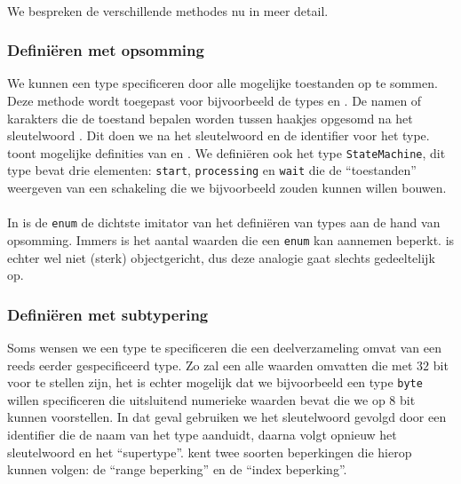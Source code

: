 \paragraph{}
We bespreken de verschillende methodes nu in meer detail.

\subsubsection{Defini\"eren met opsomming}
We kunnen een type specificeren door alle mogelijke toestanden op te sommen. Deze methode wordt toegepast voor bijvoorbeeld de types  en . De namen of karakters die de toestand bepalen worden tussen haakjes opgesomd na het sleutelwoord . Dit doen we na het sleutelwoord  en de identifier voor het type.  toont mogelijke definities van  en . We defini\"eren ook het type \texttt{StateMachine}, dit type bevat drie elementen: \texttt{start}, \texttt{processing} en \texttt{wait} die de ``toestanden'' weergeven van een schakeling die we bijvoorbeeld zouden kunnen willen bouwen.


\paragraph{}
In \tjava{} is de \texttt{enum} de dichtste imitator van het defini\"eren van types aan de hand van opsomming. Immers is het aantal waarden die een \texttt{enum} kan aannemen beperkt. \tvhdl{} is echter wel niet (sterk) objectgericht, dus deze analogie gaat slechts gedeeltelijk op.


\subsubsection{Defini\"eren met subtypering}
Soms wensen we een type te specificeren die een deelverzameling omvat van een reeds eerder gespecificeerd type. Zo zal een  alle waarden omvatten die met $32$ bit voor te stellen zijn, het is echter mogelijk dat we bijvoorbeeld een type \texttt{byte} willen specificeren die uitsluitend numerieke waarden bevat die we op $8$ bit kunnen voorstellen. In dat geval gebruiken we het sleutelwoord  gevolgd door een identifier die de naam van het type aanduidt, daarna volgt opnieuw het sleutelwoord  en het ``supertype''. \tvhdl{} kent twee soorten beperkingen die hierop kunnen volgen: de ``range beperking'' en de ``index beperking''.


